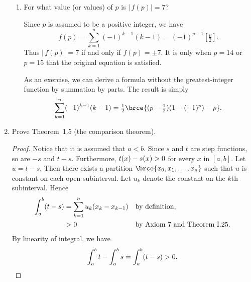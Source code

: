 \documentclass[a4paper]{article}
\begin{document}
\begin{enumerate}
\begin{enumerate}
  \item For what value (or values) of \(p\) is \(|\,f(p)| = 7\)?

    Since \(p\) is assumed to be a positive integer, we have
    \[
      f(p) = \sum_{k=1}^n (-1)^{k-1}(k-1) = (-1)^{p+1} [\tfrac p2].
    \]
    Thus \(|\,f(p)| = 7\) if and only if \(f(p) = \pm7\).  It is only
    when \(p = 14\) or \(p = 15\) that the original equation is satisfied.

    As an exercise, we can derive a formula without the greatest-integer
    function by summation by parts.  The result is simply
    \[
      \sum_{k=1}^n (-1)^{k-1}(k-1) = \tfrac12 \brce{(p-\tfrac12)(1-(-1)^p) - p}.
    \]
  \end{enumerate}

\item Prove Theorem~1.5 (the comparison theorem).

  \begin{proof}
    Notice that it is assumed that \(a < b\).  Since \(s\) and \(t\) are
    step functions, so are \(-s\) and \(t-s\).  Furthermore,
    \(\mathop{\relax\kern0pt t}\nolimits(x) - \mathop{\relax\kern0pt s}\nolimits(x) > 0\) for every \(x\) in \([a, b]\).  Let
    \(u = t - s\).  Then there exists a partition
    \(\brce{x_0, x_1, \dotsc, x_n}\) such that \(u\) is constant on each
    open subinterval.  Let \(u_k\) denote the constant on the \(k\)th
    subinterval.  Hence
    \begin{align*}
      \int_a^b (t - s)
        &= \sum_{k=1}^n u_k (x_k - x_{k-1}) && \text{by definition,} \\
        &> 0 && \text{by Axiom~7 and Theorem~I.25.}
    \end{align*}
    By linearity of integral, we have
    \[
      \int_a^b t - \int_a^b s = \int_a^b (t - s) > 0. \qedhere
    \]
  \end{proof}
\end{enumerate}
\end{document}
